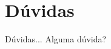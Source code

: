 \section{Dúvidas}

\begin{frame}
	\begin{block}{Dúvidas...}
		Alguma dúvida?
	\end{block}
\end{frame}
